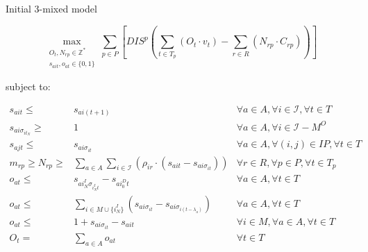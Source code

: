 \documentclass{beamer}
\begin{document}

\begin{frame}{Initial 3-mixed model}
\scriptsize

\begin{equation}
	\max_{\substack{O_t, N_{rp} \in \mathbb{Z}^* \\ 
	s_{ait}, o_{at} \in \{0, 1\}}} 
	\sum_{p \in P} [ DIS^p (\sum_{t\in T_p} (O_t \cdot v_t)  - \sum_{r\in R} (N_{rp} \cdot C_{rp})) ]
\end{equation}

\bigskip

subject to:

\begin{align}
s_{ait} \leq& s_{ai(t+1)}																	& \forall a \in A, \forall i \in \mathcal{I}, \forall t \in T	\\
s_{ai\sigma_{it_N}} \geq& 1																& \forall a \in A, \forall i \in \mathcal{I} - M^O		\\
s_{ajt} \leq& s_{ai\sigma_{it}}																& \forall a \in A, \forall (i, j) \in IP, \forall t \in T 	\\
m_{rp} \geq N_{rp} \geq& \sum_{a\in A} \sum_{i\in \mathcal{I}} (\rho_{ir} \cdot (s_{ait} - s_{ai\sigma_{it}})) 				& \forall r \in R, \forall p \in P, \forall t \in T_p 		\\
o_{at} \leq& s_{ai^I_N\sigma_{i^I_Nt}} - s_{ai^D_0t}												& \forall a \in A, \forall t \in T				\\
o_{at} \leq& \sum_{i \in M \cup \{i^I_N\}} (s_{ai\sigma_{it}} - s_{ai\sigma_{i(t-\lambda_a)}})						& \forall a \in A, \forall t \in T				\\
o_{at} \leq& 1 + s_{ai\sigma_{it}} - s_{ait}														& \forall i \in M, \forall a \in A, \forall t \in T		\\
O_t =& \sum_{a \in A} o_{at}																& \forall t \in T 						
\end{align}

\end{frame}
\end{document}
